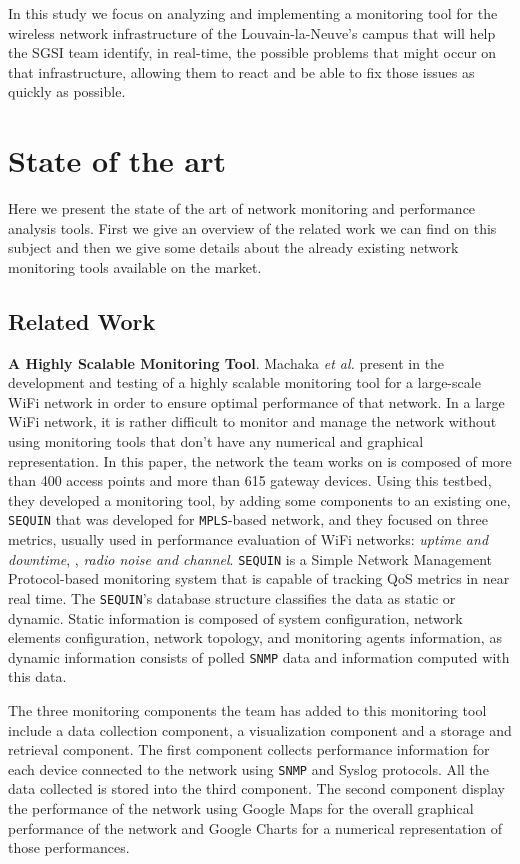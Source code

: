 In this study we focus on analyzing and implementing a monitoring tool for the wireless network infrastructure of the Louvain-la-Neuve's campus that will help the SGSI team identify, in real-time, the possible problems that might occur on that infrastructure, allowing them to react and be able to fix those issues as quickly as possible.


\section{State of the art}
Here we present the state of the art of network monitoring and performance analysis tools.
First we give an overview of the related work we can find on this subject and then we give some details about the already existing network monitoring tools available on the market.

\subsection{Related Work}

\textbf{A Highly Scalable Monitoring Tool}. Machaka \textit{et al.} present in \cite{article1} the development and testing of a highly scalable monitoring tool for a large-scale WiFi network in order to ensure optimal performance of that network. In a large WiFi network, it is rather difficult to monitor and manage the network without using monitoring tools that don't have any numerical and graphical representation. In this paper, the network the team works on is composed of more than 400 access points and more than 615 gateway devices. Using this testbed, they developed a monitoring tool, by adding some components to an existing one, \texttt{SEQUIN} \cite{sequin} that was developed for \texttt{MPLS}-based network, and they focused on three metrics, usually used in performance evaluation of WiFi networks: \textit{uptime and downtime}, , \textit{radio noise and channel}. \texttt{SEQUIN} is a Simple Network Management Protocol-based monitoring system that is capable of tracking QoS metrics in near real time. The \texttt{SEQUIN}'s database structure classifies the data as static or dynamic. Static information is composed of system configuration, network elements configuration, network topology, and monitoring agents information, as dynamic information consists of polled \texttt{SNMP} data and information computed with this data. 

The three monitoring components the team has added to this monitoring tool include a data collection component, a visualization component and a storage and retrieval component. The first component collects performance information for each device connected to the network using \texttt{SNMP} and {Syslog} protocols. All the data collected is stored into the third component. The second component display the performance of the network using Google Maps for the overall graphical performance of the network and Google Charts for a numerical representation of those performances.

